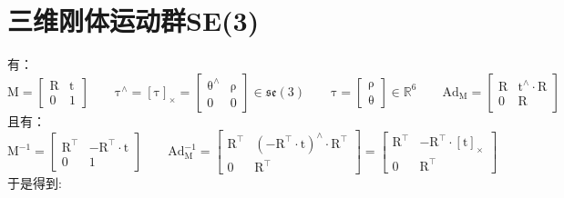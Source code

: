\documentclass[12pt, onecolumn]{article}
\newcommand\normf{\fangsong}
\newcommand\skewmat[1]{\left[ #1 \right]_\times}
\newcommand\liehat[1]{#1^{\land}}
\newcommand\bsm[1]{\boldsymbol{\mathrm{#1}}}
\begin{document}
	\section{\normf 三维刚体运动群SE(3)}
	有：
	\begin{equation}
	\bsm{M}=\begin{bmatrix}
	\bsm{R}&\bsm{t}\\
	\bsm{0}&1
	\end{bmatrix}
	\qquad
	\liehat{\bsm{\tau}}=\skewmat{\bsm{\tau}}=\begin{bmatrix}
	\liehat{\bsm\theta}&\bsm{\rho}\\
	\bsm{0}&0
	\end{bmatrix}\in\mathfrak{se}(3)
	\qquad
	\bsm{\tau}=\begin{bmatrix}
	\bsm{\rho}\\\bsm\theta
	\end{bmatrix}\in\mathbb{R}^6
	\qquad
	\bsm{Ad}_{\bsm{M}}=\begin{bmatrix}
	\bsm{R}&\liehat{\bsm{t}}\cdot\bsm{R}\\
	\bsm{0}&\bsm{R}
	\end{bmatrix}
	\end{equation}
	且有：
	\begin{equation}
	\bsm{M}^{-1}=\begin{bmatrix}
	\bsm{R}^\top&-\bsm{R}^\top\cdot\bsm{t}\\
	\bsm{0}&1
	\end{bmatrix}
		\qquad
		\bsm{Ad}_{\bsm{M}}^{-1}=\begin{bmatrix}
			\bsm{R}^\top&\liehat{\left( -\bsm{R}^\top\cdot\bsm{t}\right) }\cdot\bsm{R}^\top\\
			\bsm{0}&\bsm{R}^\top
			\end{bmatrix}
		=\begin{bmatrix}
					\bsm{R}^\top&-\bsm{R}^\top\cdot\skewmat{\bsm{t}}\\
					\bsm{0}&\bsm{R}^\top
					\end{bmatrix}
	\end{equation}
	于是得到:
\end{document}
